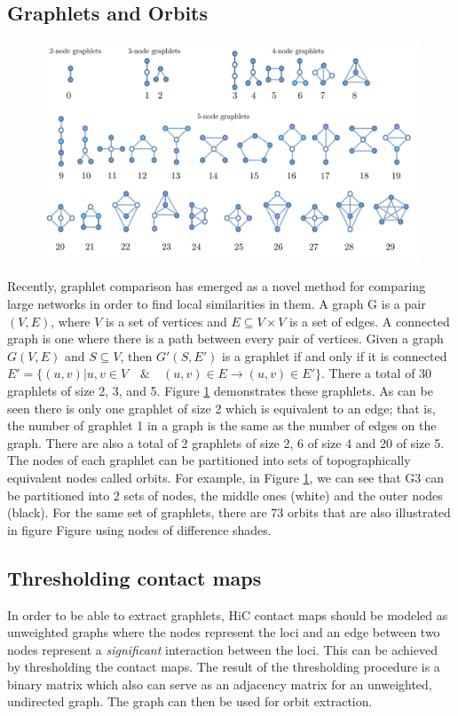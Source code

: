 \documentclass[a4,center,fleqn]{NAR}
\begin{document}
\subsection{Graphlets and Orbits}
\begin{figure}[H]
    \centering
    \includegraphics[width=.5\textwidth]{figures/graphlets.jpg}
    \caption{}
    \label{fig_graphlets}
\end{figure}
Recently, graphlet comparison has emerged as
a novel method for comparing large networks in
order to find local similarities in them. A
graph G is a pair $(V,E)$, where $V$ is a set of
vertices and $E \subseteq V\times V$ is a set of
edges. A connected graph is one where there is
a path between every pair of vertices.
Given a graph $G(V, E)$ and $S \subseteq V$,
then $G'(S, E')$ is a graphlet if and only if
it is connected $E' = \{(u, v) | u, v \in V \quad \&
\quad (u, v) \in E \rightarrow (u, v) \in E'\}$. 
There a total of 30 graphlets
of size 2, 3, and 5.  Figure \ref{fig_graphlets}
demonstrates these graphlets. 
As can be seen there is only one graphlet
of size 2 which is equivalent to an edge; that
is, the number of graphlet 1 in a graph is the
same as the number of edges on the graph. There
are also a total of 2 graphlets of size 2, 6
of size 4 and 20 of size 5. The nodes of each graphlet
can be partitioned into sets of topographically equivalent
nodes called orbits. For  example, in  Figure 
\ref{fig_graphlets}, we can see that G3 can be
partitioned into 2 sets of nodes, the middle ones
(white) and the outer nodes (black). 
For the same set of graphlets,
there are 73 orbits that are also illustrated in
figure  Figure using nodes of difference shades.

\subsection{Thresholding contact maps}
In order to be able to extract graphlets, HiC contact maps should be modeled as
unweighted graphs where the nodes represent the loci and an edge between two 
nodes represent a \textit{significant} interaction between the loci.
This can be achieved by thresholding the contact maps. The result
of the thresholding procedure is a binary matrix which also can serve as
an adjacency matrix for an unweighted, undirected graph. The graph can then be
used for orbit extraction.
\end{document}
